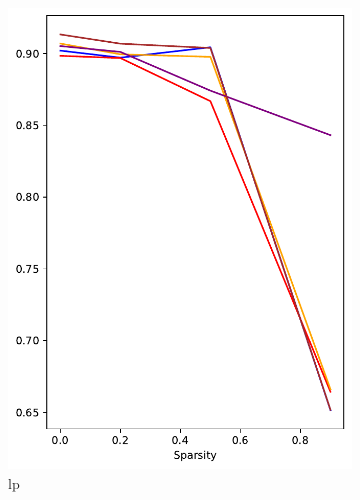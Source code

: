 \documentclass[mathematics,article,submit,pdftex,moreauthors]{Definitions/mdpi}
\begin{document}
\begin{figure}[!ht]
\begin{subfigure}[t]{.28\textwidth}
        \includegraphics[width=.95\linewidth]{figures/test/pruning-testing-score_NEA_linear.pdf}
        \caption{\ac{lp}}
        \label{fig:results:test:nea:lp}
      \end{subfigure}
      \hfill
      \begin{subfigure}[t]{.276\textwidth} 
        \centering

\end{subfigure}
\end{figure}
\end{document}
